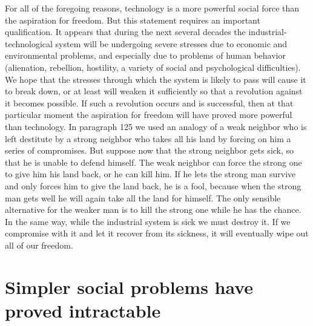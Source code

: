  For all of the foregoing reasons, technology is a more powerful social force than the aspiration for freedom. But this statement requires an important qualification. It appears that during the next several decades the industrial-technological system will be undergoing severe stresses due to economic and environmental problems, and especially due to problems of human behavior (alienation, rebellion, hostility, a variety of social and psychological difficulties). We hope that the stresses through which the system is likely to pass will cause it to break down, or at least will weaken it sufficiently so that a revolution against it becomes possible. If such a revolution occurs and is successful, then at that particular moment the aspiration for freedom will have proved more powerful than technology.\break
{} In paragraph 125 we used an analogy of a weak neighbor who is left destitute by a strong neighbor who takes all his land by forcing on him a series of compromises. But suppose now that the strong neighbor gets sick, so that he is unable to defend himself. The weak neighbor can force the strong one to give him his land back, or he can kill him. If he lets the strong man survive and only forces him to give the land back, he is a fool, because when the strong man gets well he will again take all the land for himself. The only sensible alternative for the weaker man is to kill the strong one while he has the chance. In the same way, while the industrial system is sick we must destroy it. If we compromise with it and let it recover from its sickness, it will eventually wipe out all of our freedom.

\chapter{Simpler social problems have proved intractable}

